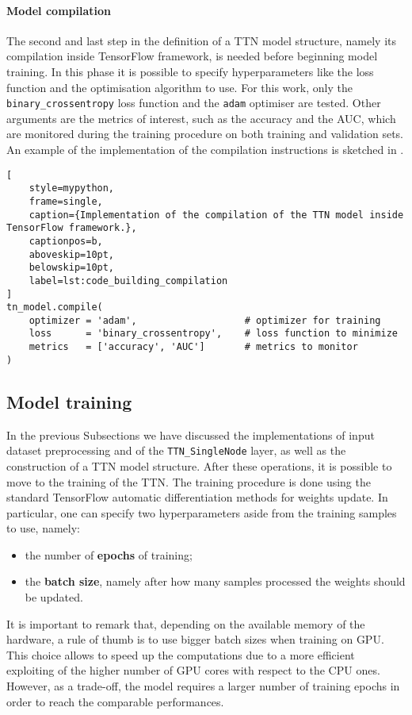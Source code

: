 \documentclass[../main/main.tex]{subfiles}
\begin{document}
\paragraph{Model compilation}
The second and last step in the definition of a TTN model structure, namely its compilation inside TensorFlow framework, is needed before beginning model training.
In this phase it is possible to specify hyperparameters like the loss function and the optimisation algorithm to use. For this work, only the \texttt{binary\_crossentropy} loss function and the \texttt{adam} optimiser are tested.
Other arguments are the metrics of interest, such as the accuracy and the AUC, which are monitored during the training procedure on both training and validation sets. An example of the implementation of the compilation instructions is sketched in .



\begin{lstlisting}[
    style=mypython,
    frame=single,
    caption={Implementation of the compilation of the TTN model inside TensorFlow framework.},
    captionpos=b,
    aboveskip=10pt,
    belowskip=10pt,
    label=lst:code_building_compilation
]
tn_model.compile(
    optimizer = 'adam',                   # optimizer for training
    loss      = 'binary_crossentropy',    # loss function to minimize
    metrics   = ['accuracy', 'AUC']       # metrics to monitor
)
\end{lstlisting}



\subsection{Model training}
\label{ssec:code_training}

In the previous Subsections we have discussed the implementations of input dataset preprocessing and of the \texttt{TTN\_SingleNode} layer, as well as the construction of a TTN model structure. After these operations, it is possible to move to the training of the TTN. The training procedure is done using the standard TensorFlow automatic differentiation methods for weights update. In particular, one can specify two hyperparameters aside from the training samples to use, namely:
\begin{itemize}
    \item the number of \textbf{epochs} of training;
    \item the \textbf{batch size}, namely after how many samples processed the weights should be updated.
\end{itemize}
It is important to remark that, depending on the available memory of the hardware, a rule of thumb is to use bigger batch sizes when training on GPU. This choice allows to speed up the computations due to a more efficient exploiting of the higher number of GPU cores with respect to the CPU ones. However, as a trade-off, the model requires a larger number of training epochs in order to reach the comparable performances.
\end{document}
